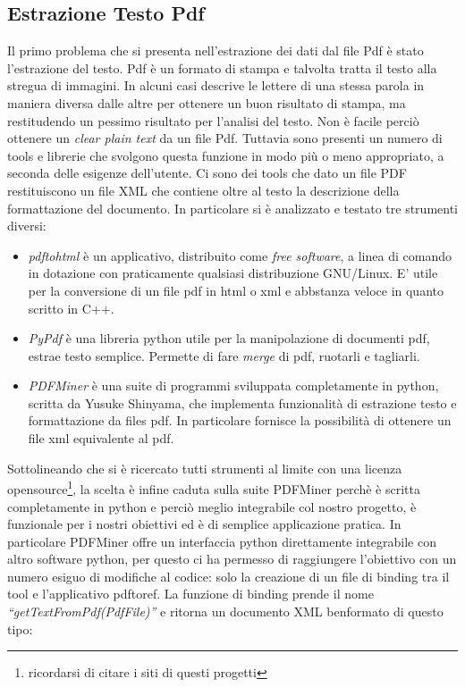 \subsection{Estrazione Testo Pdf}
Il primo problema che si presenta nell'estrazione dei dati dal file Pdf è stato l'estrazione del testo. Pdf è un formato di stampa e talvolta tratta il testo alla stregua di immagini. In alcuni casi descrive le lettere di una stessa parola in maniera diversa dalle altre per ottenere un buon risultato di stampa, ma restitudendo un pessimo risultato per l'analisi del testo. Non è facile perciò ottenere un \textit{clear plain text} da un file Pdf. Tuttavia sono presenti un numero di tools e librerie che svolgono questa funzione in modo più o meno appropriato, a seconda delle esigenze dell'utente. Ci sono dei tools che dato un file PDF restituiscono un file XML che contiene oltre al testo la descrizione della formattazione del documento. 
In particolare si è analizzato e testato tre strumenti diversi:
\begin{itemize}
 \item \textit{pdftohtml} è un applicativo, distribuito come \textit{free software}, a linea di comando in dotazione con praticamente qualsiasi distribuzione GNU/Linux. E' utile per la conversione di un file pdf in html o xml e abbstanza veloce in quanto scritto in C++.
 \item \textit{PyPdf} è una libreria python utile per la manipolazione di documenti pdf, estrae testo semplice. Permette di fare \textit{merge} di pdf, ruotarli e tagliarli.
 \item \textit{PDFMiner} è una suite di programmi sviluppata completamente in python, scritta da Yusuke Shinyama, che implementa funzionalità di estrazione testo e formattazione da files pdf. In particolare fornisce la possibilità di ottenere un file xml equivalente al pdf.
\end{itemize}

Sottolineando che si è ricercato tutti strumenti al limite con una licenza opensource\footnote{ricordarsi di citare i siti di questi progetti}, la scelta è infine caduta sulla suite PDFMiner perchè è scritta completamente in python e perciò meglio integrabile col nostro progetto, è funzionale per i nostri obiettivi ed è di semplice applicazione pratica.
In particolare PDFMiner offre un interfaccia python direttamente integrabile con altro software python, per questo ci ha permesso di raggiungere l'obiettivo con un numero esiguo di modifiche al codice: solo la creazione di un file di binding tra il tool e l'applicativo pdftoref. La funzione di binding prende il nome \textit{``getTextFromPdf(PdfFile)''} e ritorna un documento XML benformato di questo tipo:

